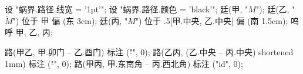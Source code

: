 
设 "蜗界.路径.线宽 = '1pt'";
设 "蜗界.路径.颜色 = 'black'";
廷(甲, "$M$");
廷(乙, "$\tilde{M}$") 位于 甲 偏 (东 3cm);
廷(丙, "$M$") 位于 .5[甲.中央, 乙.中央] 偏 (南 1.5cm);
呜呼 甲, 乙, 丙;

路(甲乙, 甲.卯门 -- 乙.酉门) 标注 ("$\tilde{}$", 0);
路(乙丙, (乙.中央 -- 丙.中央) shortened 1mm) 标注 ("$\tilde{}$", 0);
路(甲丙, 甲.东南角 -- 丙.西北角) 标注 ("id", 0);
\stopuseMPgraphic

\startTEXpage[offset=4pt]
\stopTEXpage
